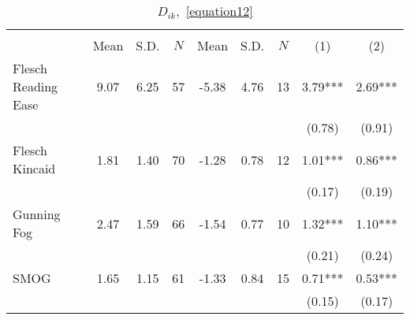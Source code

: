 \begin{table}[H]
    \footnotesize
    \centering
    \begin{threeparttable}
        \caption{\(D_{ik}\),~\autoref{equation12}}
        \label{tableC15}
        \begin{tabular}{p{3cm}S[table-format=3.3]@{}S[table-format=3.3]@{}S[table-format=3.2]@{}S[table-format=4.3]@{}S[table-format=3.3]@{}S[table-format=3.1]@{}S@{}S@{}}
            \toprule
            &&&\\\cmidrule(lr){2-4}\cmidrule(lr){5-7}\cmidrule(lr){8-9}&{{Mean}}&{{S.D.}}&{{\(N\)}}&{{Mean}}&{{S.D.}}&{{\(N\)}}&{{(1)}}&{{(2)}}\\
            \midrule
            Flesch Reading Ease           &        9.07&        6.25&          57&       -5.38&        4.76&          13&        3.79***&        2.69***\\
                                          &            &            &            &            &            &            &      (0.78)   &      (0.91)   \\
            Flesch Kincaid                &        1.81&        1.40&          70&       -1.28&        0.78&          12&        1.01***&        0.86***\\
                                          &            &            &            &            &            &            &      (0.17)   &      (0.19)   \\
            Gunning Fog                   &        2.47&        1.59&          66&       -1.54&        0.77&          10&        1.32***&        1.10***\\
                                          &            &            &            &            &            &            &      (0.21)   &      (0.24)   \\
            SMOG                          &        1.65&        1.15&          61&       -1.33&        0.84&          15&        0.71***&        0.53***\\
                                          &            &            &            &            &            &            &      (0.15)   &      (0.17)   \\

\end{tabular}
\end{threeparttable}
\end{table}
